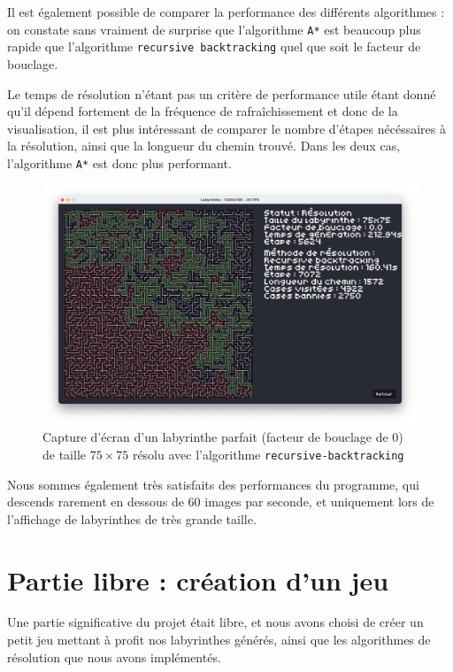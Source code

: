 \documentclass[12pt]{scrreprt} %
\begin{document}
Il est également possible de comparer la performance des différents algorithmes : on constate sans vraiment de surprise que l'algorithme \texttt{A*} est beaucoup plus rapide que l'algorithme \texttt{recursive backtracking} quel que soit le facteur de bouclage.

Le temps de résolution n'étant pas un critère de performance utile étant donné qu'il dépend fortement de la fréquence de rafraîchissement et donc de la visualisation, il est plus intéressant de comparer le nombre d'étapes nécéssaires à la résolution, ainsi que la longueur du chemin trouvé. Dans les deux cas, l'algorithme \texttt{A*} est donc plus performant.


\begin{figure}[h]
    \centering
    \includegraphics[width=\textwidth]{images/recbacksolved75.png}
    \caption{Capture d'écran d'un labyrinthe parfait (facteur de bouclage de $0$) de taille $75 \times 75$ résolu avec l'algorithme \texttt{recursive-backtracking}}
\end{figure}

Nous sommes également très satisfaits des performances du programme, qui descends rarement en dessous de 60 images par seconde, et uniquement lors de l'affichage de labyrinthes de très grande taille.

\section{Partie libre : création d'un jeu}

Une partie significative du projet était libre, et nous avons choisi de créer un petit jeu mettant à profit nos labyrinthes générés, ainsi que les algorithmes de résolution que nous avons implémentés.
\end{document}
